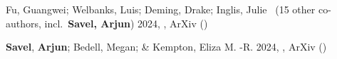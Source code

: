 \item[{\color{numcolor}\scriptsize2}] Fu, Guangwei; Welbanks, Luis; Deming, Drake; Inglis, Julie \etal\ ({15} other co-authors, incl.\ \textbf{Savel, Arjun}) 2024, , ArXiv ()

\item[{\color{numcolor}\scriptsize1}] \textbf{Savel}, \textbf{Arjun}; Bedell, Megan; \& Kempton, Eliza M. -R. 2024, , ArXiv ()
